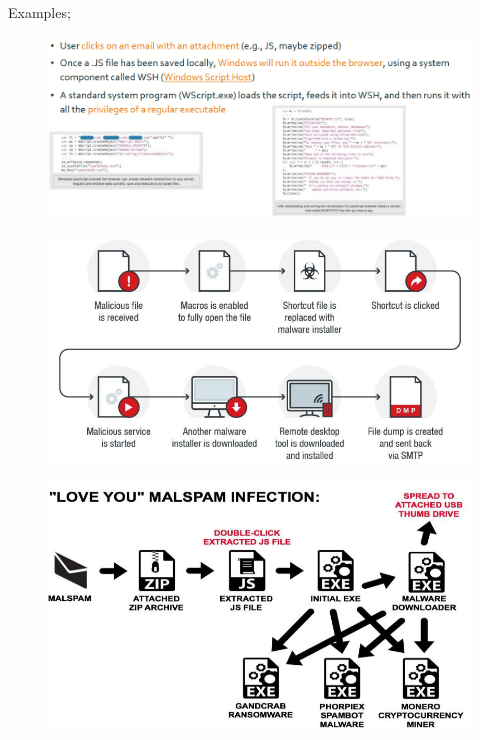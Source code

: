 \documentclass[]{project_plan}
\begin{document}
Examples;
\begin{figure}[H]
  \centering
  \includegraphics[width=\linewidth]{web vuln example.png}
\end{figure}
\begin{figure}[H]
  \centering
  \includegraphics[width=\linewidth]{web vuln example 2.png}
\end{figure}
\begin{figure}[H]
  \centering
  \includegraphics[width=\linewidth]{web vuln example 3.png}
\end{figure}
\end{document}
